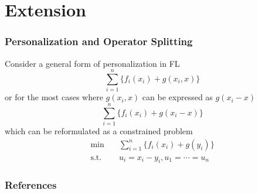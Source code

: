 
\section{Extension}


\begin{frame}
\frametitle{Personalization and Operator Splitting}

Consider a general form of personalization in FL
$$\sum_{i=1}^n \{ f_i(x_i) + g(x_i,x) \}$$
or for the most cases where $g(x_i,x)$ can be expressed as $g(x_i-x)$
$$\sum_{i=1}^n \{ f_i(x_i) + g(x_i-x) \}$$
which can be reformulated as a constrained problem
\begin{align*}
    \min & \quad \sum_{i=1}^n \{ f_i(x_i) + g(y_i) \} \\
    \text{s.t.} & \quad u_i = x_i-y_i, u_1 = \cdots = u_n
\end{align*}

\end{frame}


\begin{frame}[allowframebreaks]
\frametitle{References}

{\footnotesize


}

\end{frame}



